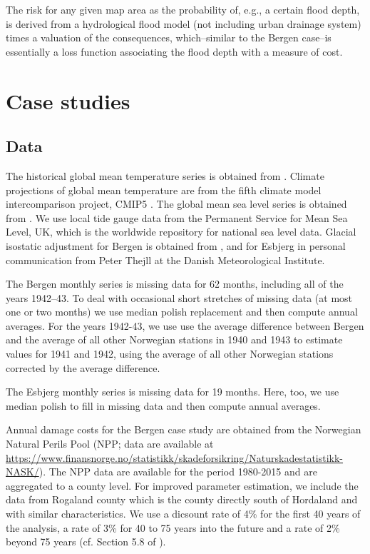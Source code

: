 \documentclass[draft,linenumbers]{agujournal}
\begin{document}
The risk for any given map area as the probability of, e.g., a certain flood depth, is derived from a hydrological flood model (not including urban drainage system) times a valuation of the consequences, which--similar to the Bergen case--is essentially a loss function associating the flood depth with a measure of cost. 


\section{Case studies}
\label{cases}

\subsection{Data}
The historical global mean temperature series is obtained from \citet{giss}. Climate projections of global mean temperature are from the fifth climate model intercomparison project, CMIP5 \citep{cmip5}. The global mean sea level series is obtained from \citet{csiro}. We use local tide gauge data from the Permanent Service for Mean Sea Level, UK, which is the worldwide repository for national sea level data. Glacial isostatic adjustment for Bergen is obtained from \citet{Simpson2014}, and for Esbjerg in personal communication from Peter Thejll at the Danish Meteorological Institute. 

The Bergen monthly series is missing data for 62 months, including all of the years 1942--43. To deal with occasional short stretches of missing data (at most one or two months) we use median polish replacement \citep{medpol} and then compute annual averages. For the years 1942-43, we use use the average difference between Bergen and the average of all other Norwegian stations in 1940 and 1943 to estimate values for 1941 and 1942, using the average of all other Norwegian stations corrected by the average difference. 

The Esbjerg monthly series is missing data for 19 months. Here, too, we use median polish to fill in missing data and then compute annual averages.

Annual damage costs for the Bergen case study are obtained from the Norwegian Natural Perils Pool (NPP;  data are available at \url{https://www.finansnorge.no/statistikk/skadeforsikring/Naturskadestatistikk-NASK/}). The NPP data are available for the period 1980-2015 and are aggregated to a county level. For improved parameter estimation, we include the data from Rogaland county which is the county directly south of Hordaland and with similar characteristics. We use a dicsount rate of 4\% for the first 40 years of the analysis, a rate of 3\% for 40 to 75 years into the future and a rate of 2\% beyond 75 years (cf. Section 5.8 of \citet{DiscountRate}).  
\end{document}
